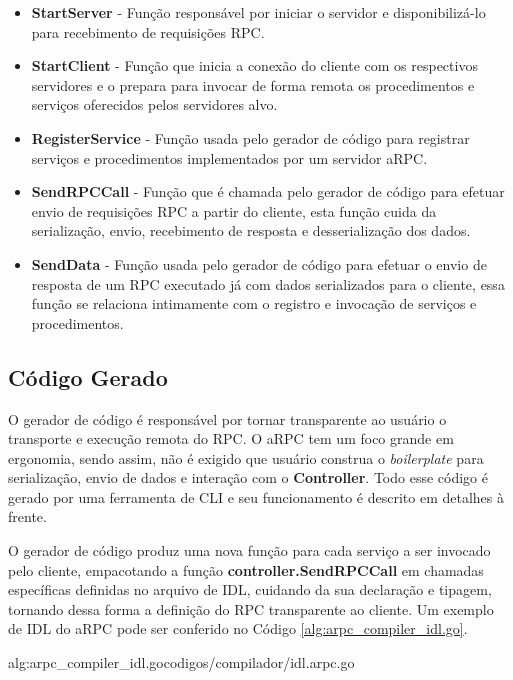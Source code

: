 \begin{itemize}
	\item \textbf{StartServer} - Função responsável por iniciar o servidor e disponibilizá-lo para recebimento de requisições RPC.
	\item \textbf{StartClient} - Função que inicia a conexão do cliente com os respectivos servidores e o prepara para invocar de forma remota os procedimentos e serviços oferecidos pelos servidores alvo.
	\item \textbf{RegisterService} - Função usada pelo gerador de código para registrar serviços e procedimentos implementados por um servidor aRPC.
	\item \textbf{SendRPCCall} - Função que é chamada pelo gerador de código para efetuar envio de requisições RPC a partir do cliente, esta função cuida da serialização, envio, recebimento de resposta e desserialização dos dados.
	\item \textbf{SendData} - Função usada pelo gerador de código para efetuar o envio de resposta de um RPC executado já com dados serializados para o cliente, essa função se relaciona intimamente com o registro e invocação de serviços e procedimentos.
\end{itemize}

\subsection{Código Gerado}

O gerador de código é responsável por tornar transparente ao usuário o transporte e execução remota do RPC. O aRPC tem um foco grande em ergonomia, sendo assim, não é exigido que usuário construa o \textit{boilerplate} para serialização, envio de dados e interação com o \textbf{Controller}. Todo esse código é gerado por uma ferramenta de CLI e seu funcionamento  é descrito em detalhes à frente.

O gerador de código produz uma nova função para cada serviço a ser invocado pelo cliente, empacotando a função \textbf{controller.SendRPCCall} em chamadas específicas definidas no arquivo de IDL, cuidando da sua declaração e tipagem, tornando dessa forma a definição do RPC transparente ao cliente. Um exemplo de IDL do aRPC pode ser conferido no Código \ref{alg:arpc_compiler_idl.go}.

 {alg:arpc_compiler_idl.go}{codigos/compilador/idl.arpc.go}{}

